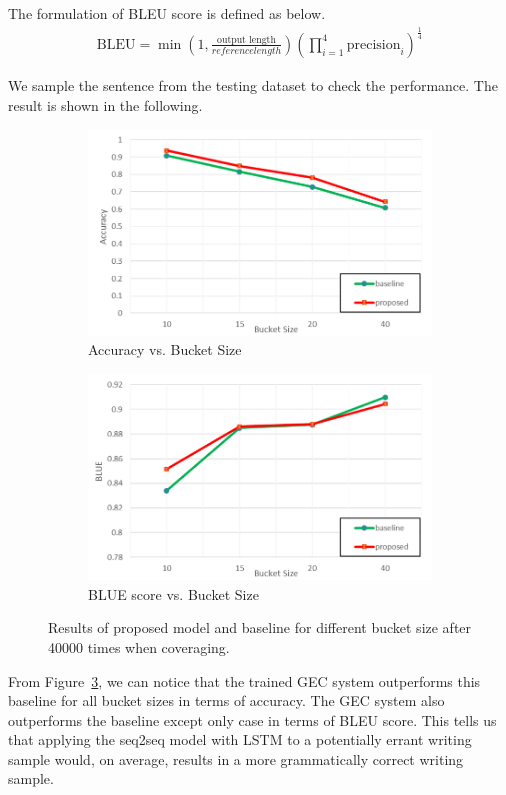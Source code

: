 The formulation of BLEU score is defined as below.
\begin{align}
    \text{BLEU}=\min(1, \frac{\text{output length}}{reference length})(\prod_{i=1}^{4}\text{precision}_{i})^{\frac{1}{4}}
\end{align}

We sample the sentence from the testing dataset to check the performance. The result is shown in the following.
\begin{figure}
\centering
\begin{subfigure}{.5\textwidth}
    \centering
    \includegraphics[width=.9\linewidth]{ACCU1.png}
    \caption{Accuracy vs. Bucket Size}
    \label{fig:sub1}
\end{subfigure}%
\begin{subfigure}{.5\textwidth}
    \centering
    \includegraphics[width=.9\linewidth]{BLUE1.png}
    \caption{BLUE score vs. Bucket Size}
    \label{fig:sub2}
\end{subfigure}
\caption{Results of proposed model and baseline for different bucket size after 40000 times when coveraging.}
\label{fig:9}
\end{figure}
From Figure~\ref{fig:9}, we can notice that the trained GEC system outperforms this baseline for all bucket sizes in terms of accuracy. The GEC system also outperforms the baseline except only case in terms of BLEU score. This tells us that applying the seq2seq model with LSTM to a potentially errant writing sample would, on average, results in a more grammatically correct writing sample. 

